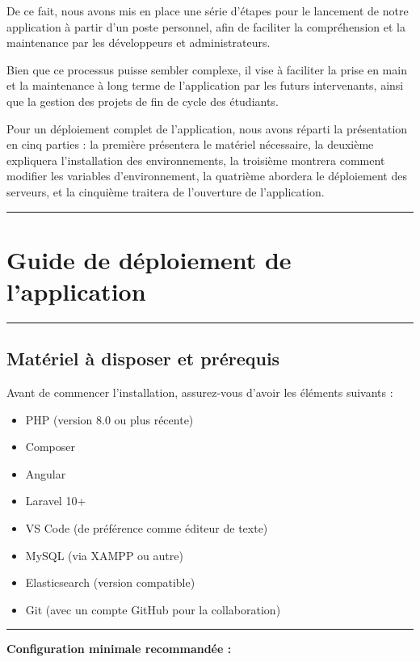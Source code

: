 \documentclass[12pt]{article}
\begin{document}
De ce fait, nous avons mis en place une série d'étapes pour le lancement de notre application
à partir d’un poste personnel, afin de faciliter la compréhension et la maintenance par les
développeurs et administrateurs.

Bien que ce processus puisse sembler complexe, il vise à faciliter la prise en main et la
maintenance à long terme de l’application par les futurs intervenants, ainsi que la gestion
des projets de fin de cycle des étudiants.

Pour un déploiement complet de l'application, nous avons réparti la présentation en cinq
parties : la première présentera le matériel nécessaire, la deuxième expliquera l'installation
des environnements, la troisième montrera comment modifier les variables d'environnement, la
quatrième abordera le déploiement des serveurs, et la cinquième traitera de l'ouverture de l'application.

\vspace{0.5cm}
\rule{\linewidth}{0.2pt}

\newpage
{\fontsize{14}{16}\section*{Guide de déploiement de l’application}}
\setcounter{subsection}{0} %
\renewcommand\thesubsection{\arabic{subsection}}
\rule{\linewidth}{0.2pt}
\subsection{Matériel à disposer et prérequis}

Avant de commencer l'installation, assurez-vous d'avoir les éléments suivants :

\begin{itemize}[label=--]
    \item PHP (version 8.0 ou plus récente)
    \item Composer
    \item Angular
    \item Laravel 10+
    \item VS Code (de préférence comme éditeur de texte)
    \item MySQL (via XAMPP ou autre)
    \item Elasticsearch (version compatible)
    \item Git (avec un compte GitHub pour la collaboration)
\end{itemize}
\rule{\linewidth}{0.2pt}
\textbf{Configuration minimale recommandée :}
\end{document}

